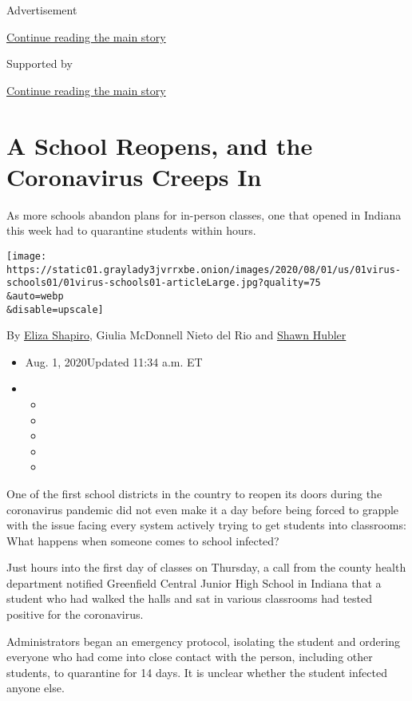 Advertisement

\protect\hyperlink{after-top}{Continue reading the main story}

Supported by

\protect\hyperlink{after-sponsor}{Continue reading the main story}

\hypertarget{a-school-reopens-and-the-coronavirus-creeps-in}{%
\section{A School Reopens, and the Coronavirus Creeps
In}\label{a-school-reopens-and-the-coronavirus-creeps-in}}

As more schools abandon plans for in-person classes, one that opened in
Indiana this week had to quarantine students within hours.

\texttt{[image: https://static01.graylady3jvrrxbe.onion/images/2020/08/01/us/01virus-schools01/01virus-schools01-articleLarge.jpg?quality=75\\\&auto=webp\\\&disable=upscale]}

By \href{https://www.nytimes3xbfgragh.onion/by/eliza-shapiro}{Eliza
Shapiro}, Giulia McDonnell Nieto del Rio and
\href{https://www.nytimes3xbfgragh.onion/by/shawn-hubler}{Shawn Hubler}

\begin{itemize}
\item
  Aug. 1, 2020Updated 11:34 a.m. ET
\item
  \begin{itemize}
  \item
  \item
  \item
  \item
  \item
  \end{itemize}
\end{itemize}

One of the first school districts in the country to reopen its doors
during the coronavirus pandemic did not even make it a day before being
forced to grapple with the issue facing every system actively trying to
get students into classrooms: What happens when someone comes to school
infected?

Just hours into the first day of classes on Thursday, a call from the
county health department notified Greenfield Central Junior High School
in Indiana that a student who had walked the halls and sat in various
classrooms had tested positive for the coronavirus.

Administrators began an emergency protocol, isolating the student and
ordering everyone who had come into close contact with the person,
including other students, to quarantine for 14 days. It is unclear
whether the student infected anyone else.

